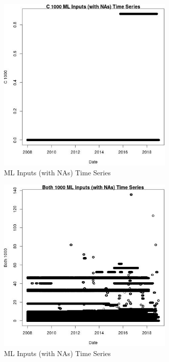 \begin{figure} 
\centering  
\includegraphics[width=0.77\textwidth]{Code_Outputs/Report_ML_input_PM25_Step4_part_e_de_duplicated_aveswNAs_C_1000vDate.jpg} 
\caption{\label{fig:Report_ML_input_PM25_Step4_part_e_de_duplicated_aveswNAsC_1000vDate}ML Inputs (with NAs) Time Series} 
\end{figure} 
 

\begin{figure} 
\centering  
\includegraphics[width=0.77\textwidth]{Code_Outputs/Report_ML_input_PM25_Step4_part_e_de_duplicated_aveswNAs_Both_1000vDate.jpg} 
\caption{\label{fig:Report_ML_input_PM25_Step4_part_e_de_duplicated_aveswNAsBoth_1000vDate}ML Inputs (with NAs) Time Series} 
\end{figure} 
 

